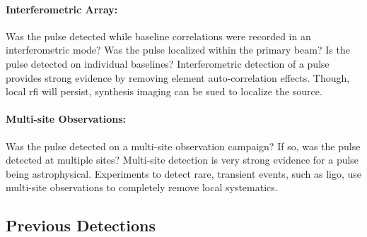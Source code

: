 \documentclass[a4paper,fleqn,usenatbib]{mnras}
\begin{document}
\paragraph{Interferometric Array:}

Was the pulse detected while baseline correlations were recorded in an
interferometric mode? Was the pulse localized within the primary beam? Is the
pulse detected on individual baselines? Interferometric detection of a pulse
provides strong evidence by removing element auto-correlation effects. Though,
local \gls{rfi} will persist, synthesis imaging can be sued to localize the
source.

\paragraph{Multi-site Observations:}

Was the pulse detected on a multi-site observation campaign? If so, was the
pulse detected at multiple sites? Multi-site detection is very strong evidence
for a pulse being astrophysical. Experiments to detect rare, transient events,
such as \gls{ligo}, use multi-site observations to completely remove local
systematics.

\subsection{Previous Detections}
\end{document}
